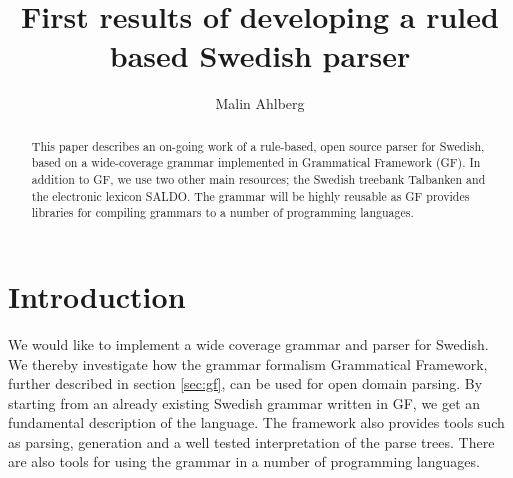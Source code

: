 \documentclass[submission]{eptcs} %
\title{First results of developing a ruled based Swedish parser} %
\author{Malin Ahlberg
\institute{Center of Language Technology, Gothenburg University, Sweden}
}
\begin{document}
\maketitle

\begin{abstract}
This paper describes an on-going work of a rule-based, open source
parser for Swedish, based on a wide-coverage grammar implemented in
Grammatical Framework (GF).
In addition to GF, we use two other main resources; the Swedish treebank Talbanken
and the electronic lexicon SALDO.
The grammar will be highly reusable as GF provides libraries for compiling
grammars to a number of programming languages.
% 




\end{abstract}

\section{Introduction}


We would like to implement a wide coverage grammar and parser for Swedish.
We thereby investigate how the grammar formalism Grammatical Framework,
further described in section \ref{sec:gf}, can be used for open domain parsing.
By starting from an already existing Swedish grammar written in GF, we get 
an fundamental description of the language. The framework also provides
tools such as parsing, generation and
a well tested interpretation of the parse trees. There are also tools for using
the grammar in a number of programming languages. 
\end{document}
